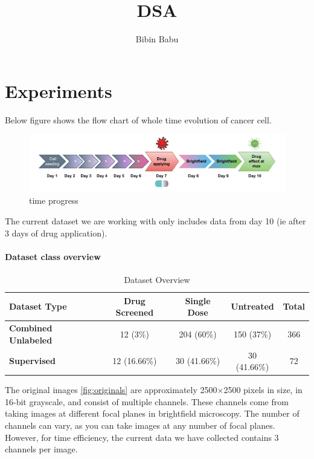 \documentclass[a4paper,12pt]{report}
\title{DSA}
\author{Bibin Babu}
\begin{document}
\maketitle

\chapter{Experiments}\label{ch:Experiments}

Below figure shows the flow chart of whole time evolution of cancer cell.

\begin{figure}[H]
  \centering
  \includegraphics[scale=0.9]{figures/time.pdf} 
  \caption{time progress}
  \label{fig:time}
\end{figure}

The current dataset we are working with only includes data from day 10 (ie after 3 days of drug application). 

\vspace{1em} %

\subsubsection{Dataset class overview}
\begin{table}[ht!]
  \centering
  \begin{tabular}{|l|c|c|c|c|}
  \hline
  \textbf{Dataset Type} & \textbf{Drug Screened} & \textbf{Single Dose} & \textbf{Untreated} & \textbf{Total} \\ \hline
  \textbf{Combined Unlabeled} & 12 (3\%) & 204 (60\%) & 150 (37\%) & 366 \\ \hline
  \textbf{Supervised}         & 12 (16.66\%) & 30 (41.66\%)  & 30 (41.66\%) & 72  \\ \hline
  \end{tabular}
  \caption{Dataset Overview}
  \label{tab:dataset}
  \end{table}

The original images \ref{fig:originals} are approximately 2500×2500 pixels in size, in 16-bit grayscale, and consist of multiple channels. These channels come from taking images at different focal planes in brightfield microscopy. The number of channels can vary, as you can take images at any number of focal planes. However, for time efficiency, the current data we have collected contains 3 channels per image.
\end{document}
